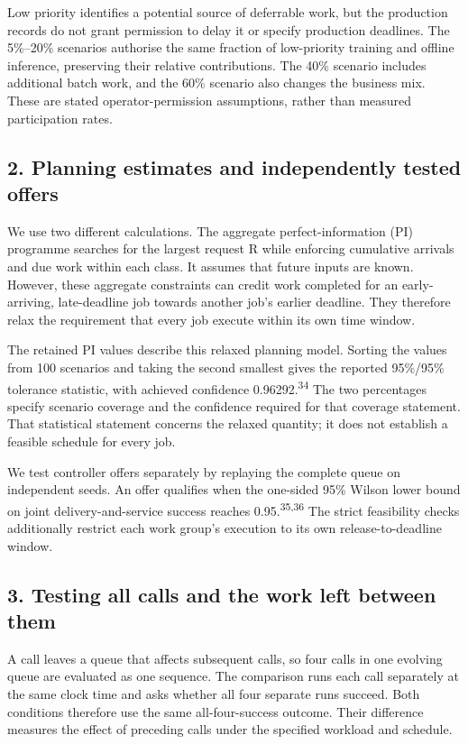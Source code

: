\documentclass[10pt,a4paper]{article}
\begin{document}
Low priority identifies a potential source of deferrable work, but the production records do not grant permission to delay it or specify production deadlines. The 5\%–20\% scenarios authorise the same fraction of low-priority training and offline inference, preserving their relative contributions. The 40\% scenario includes additional batch work, and the 60\% scenario also changes the business mix. These are stated operator-permission assumptions, rather than measured participation rates.


\subsection{2. Planning estimates and independently tested offers}

We use two different calculations. The aggregate perfect-information (PI) programme searches for the largest request R while enforcing cumulative arrivals and due work within each class. It assumes that future inputs are known. However, these aggregate constraints can credit work completed for an early-arriving, late-deadline job towards another job's earlier deadline. They therefore relax the requirement that every job execute within its own time window.


The retained PI values describe this relaxed planning model. Sorting the values from 100 scenarios and taking the second smallest gives the reported 95\%/95\% tolerance statistic, with achieved confidence 0.96292.\textsuperscript{34} The two percentages specify scenario coverage and the confidence required for that coverage statement. That statistical statement concerns the relaxed quantity; it does not establish a feasible schedule for every job.


We test controller offers separately by replaying the complete queue on independent seeds. An offer qualifies when the one-sided 95\% Wilson lower bound on joint delivery-and-service success reaches 0.95.\textsuperscript{35,36} The strict feasibility checks additionally restrict each work group's execution to its own release-to-deadline window.


\subsection{3. Testing all calls and the work left between them}

A call leaves a queue that affects subsequent calls, so four calls in one evolving queue are evaluated as one sequence. The comparison runs each call separately at the same clock time and asks whether all four separate runs succeed. Both conditions therefore use the same all-four-success outcome. Their difference measures the effect of preceding calls under the specified workload and schedule.
\end{document}
